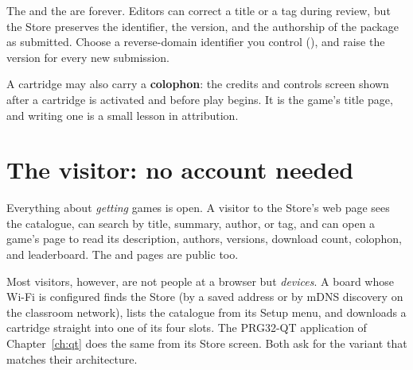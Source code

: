 

\begin{prgwarn}
The  and the  are forever. Editors can correct a title
or a tag during review, but the Store preserves the identifier, the version,
and the authorship of the package as submitted. Choose a reverse-domain
identifier you control (), and raise the
version for every new submission.
\end{prgwarn}

A cartridge may also carry a \textbf{colophon}: the credits and controls screen
shown after a cartridge is activated and before play begins. It is the game's
title page, and writing one is a small lesson in attribution.



\section{The visitor: no account needed}

Everything about \emph{getting} games is open. A visitor to the Store's web
page sees the catalogue, can search by title, summary, author, or tag, and can
open a game's page to read its description, authors, versions, download count,
colophon, and leaderboard. The  and  pages are public
too.

Most visitors, however, are not people at a browser but \emph{devices}. A \prg
board whose Wi\nobreakdash-Fi is configured finds the Store (by a saved address
or by mDNS discovery on the classroom network), lists the catalogue from its
Setup menu, and downloads a cartridge straight into one of its four slots. The
PRG32-QT application of Chapter~\ref{ch:qt} does the same from its Store
screen. Both ask for the variant that matches their architecture.



